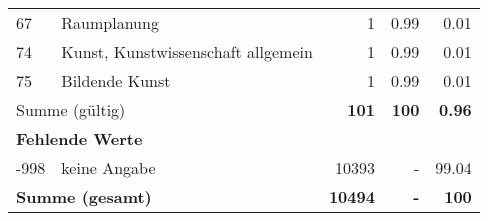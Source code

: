 \begin{longtable}{lXrrr}
        67 & \multicolumn{1}{X}{Raumplanung} & %
          \num{1} &
          \num[round-mode=places,round-precision=2]{0,99} &
          \num[round-mode=places,round-precision=2]{0,01} \\

        74 & \multicolumn{1}{X}{Kunst, Kunstwissenschaft allgemein} & %
          \num{1} &
          \num[round-mode=places,round-precision=2]{0,99} &
          \num[round-mode=places,round-precision=2]{0,01} \\

        75 & \multicolumn{1}{X}{Bildende Kunst} & %
          \num{1} &
          \num[round-mode=places,round-precision=2]{0,99} &
          \num[round-mode=places,round-precision=2]{0,01} \\

     \midrule
     \multicolumn{2}{l}{Summe (gültig)} &
       \textbf{\num{101}} &
     \textbf{100} &
       \textbf{\num[round-mode=places,round-precision=2]{0,96}} \\
     \multicolumn{5}{l}{\textbf{Fehlende Werte}}\\
       -998 &
       keine Angabe &
         \num{10393} &
        - &
         \num[round-mode=places,round-precision=2]{99,04} \\
     \midrule
     \multicolumn{2}{l}{\textbf{Summe (gesamt)}} &
          \textbf{\num{10494}} &
        \textbf{-} &
        \textbf{100} \\
     \bottomrule
     \end{longtable}
     
